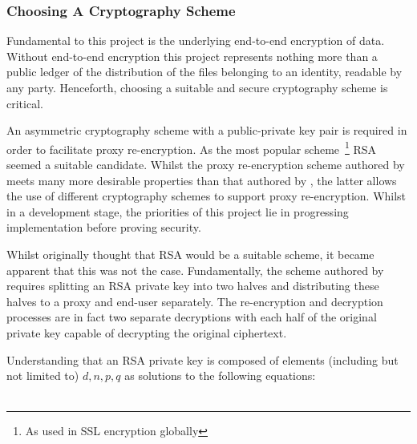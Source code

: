 \subsubsection{Choosing A Cryptography Scheme}

Fundamental to this project is the underlying end-to-end encryption of data. Without end-to-end encryption this project represents nothing more than a public ledger of the distribution of the files belonging to an identity, readable by any party. Henceforth, choosing a suitable and secure cryptography scheme is critical.

An asymmetric cryptography scheme with a public-private key pair is required in order to facilitate proxy re-encryption. As the most popular scheme~\footnote{As used in SSL encryption globally} RSA~\cite{rsa:1978:article} seemed a suitable candidate. Whilst the proxy re-encryption scheme authored by \cite{afgh:2006:article} meets many more desirable properties than that authored by \cite{ivandodis:2003:inproceedings}, the latter allows the use of different cryptography schemes to support proxy re-encryption. Whilst in a development stage, the priorities of this project lie in progressing implementation before proving security.

Whilst originally thought that RSA would be a suitable scheme, it became apparent that this was not the case. Fundamentally, the scheme authored by \cite{ivandodis:2003:inproceedings} requires splitting an RSA private key into two halves and distributing these halves to a proxy and end-user separately. The re-encryption and decryption processes are in fact two separate decryptions with each half of the original private key capable of decrypting the original ciphertext.

Understanding that an RSA private key is composed of elements (including but not limited to) $d, n, p, q$ as solutions to the following equations:

$$
\begin{aligned}
  
\end{aligned}
$$
